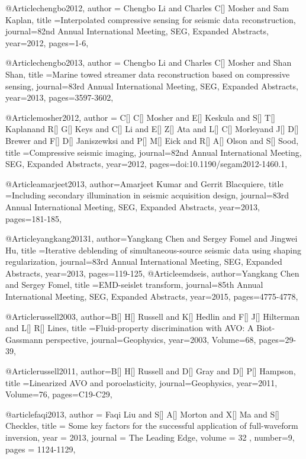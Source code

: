 {@Article{chengbo2012,
  author = {Chengbo Li and Charles C[] Mosher and Sam Kaplan},
  title ={Interpolated compressive sensing for seismic data reconstruction},
  journal={82nd Annual International Meeting, SEG, Expanded Abstracts},
  year=2012,
  pages={1-6},
}

@Article{chengbo2013,
  author = {Chengbo Li and Charles C[] Mosher and Shan Shan},
  title ={Marine towed streamer data reconstruction based on compressive sensing},
  journal={83rd Annual International Meeting, SEG, Expanded Abstracts},
  year=2013,
  pages={3597-3602},
}

@Article{mosher2012,
  author = {C[] C[] Mosher and E[] Keskula and S[] T[] Kaplanand R[] G[] Keys and C[] Li and E[] Z[] Ata and L[] C[] Morleyand J[] D[] Brewer and F[] D[] Janiszewksi and P[] M[] Eick and R[] A[] Olson and S[] Sood},
  title ={Compressive seismic imaging},
  journal={82nd Annual International Meeting, SEG, Expanded Abstracts},
  year=2012,
  pages={doi:10.1190/segam2012-1460.1},
}


@Article{amarjeet2013,
  author={Amarjeet Kumar and Gerrit Blacquiere},
  title ={Including secondary illumination in seismic acquisition design},
  journal={83rd Annual International Meeting, SEG, Expanded Abstracts},
  year=2013,
  pages={181-185},
}

@Article{yangkang20131,
  author={Yangkang Chen and Sergey Fomel and Jingwei Hu},
  title ={Iterative deblending of simultaneous-source seismic data using shaping regularization},
  journal={83rd Annual International Meeting, SEG, Expanded Abstracts},
  year=2013,
  pages={119-125},
}
@Article{emdseis,
  author={Yangkang Chen and Sergey Fomel},
  title ={E{MD}-seislet transform},
  journal={85th Annual International Meeting, SEG, Expanded Abstracts},
  year=2015,
  pages={4775-4778},
}


@Article{russell2003,
  author={B[] H[] Russell and K[] Hedlin and F[] J[] Hilterman and L[] R[] Lines},
  title ={Fluid-property discrimination with AVO: A Biot-Gassmann perspective},
  journal={Geophysics},
  year=2003,
  Volume=68,
  pages={29-39},
}

@Article{russell2011,
  author={B[] H[] Russell and D[] Gray and D[] P[] Hampson},
  title ={Linearized AVO and poroelasticity},
  journal={Geophysics},
  year=2011,
  Volume=76,
  pages={C19-C29},
}






@article{faqi2013,
  author =	 {Faqi Liu and S[] A[] Morton and X[] Ma and S[] Checkles},
  title =	 {Some key factors for the successful application of full-waveform inversion},
  year =	 2013,
  journal =	 {The Leading Edge},
  volume = 32	 ,
  number=9,
  pages =	 {1124-1129},
}


}
